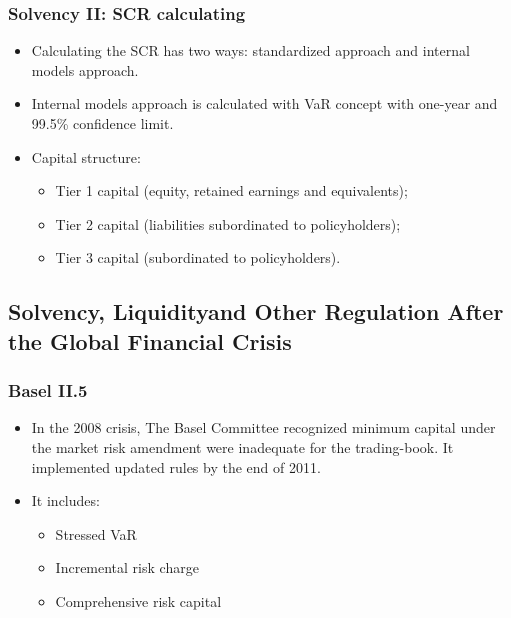 \subsubsection{Solvency II: SCR calculating}
\begin{itemize}
\item Calculating the SCR has two ways: standardized approach and internal models approach.
\item Internal models approach is calculated with VaR concept with one-year and 99.5\% confidence limit.
\item Capital structure:
    \begin{itemize}
    \item Tier 1 capital (equity, retained earnings and equivalents);
    \item Tier 2 capital (liabilities subordinated to policyholders);
    \item Tier 3 capital (subordinated to policyholders).
    \end{itemize}
    
\end{itemize}




\subsection{Solvency, Liquidityand Other Regulation After the Global Financial Crisis}


\subsubsection{Basel II.5}
\begin{itemize}
\item In the 2008 crisis, The Basel Committee recognized minimum capital under the market risk amendment were inadequate for the trading-book. It implemented updated rules by the end of 2011. 
\item It includes:
    \begin{itemize}
    \item Stressed VaR
    \item Incremental risk charge
    \item Comprehensive risk capital
    \end{itemize}
\end{itemize}



